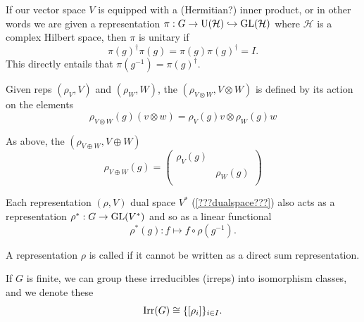 \begin{definition} If our vector space $V$ is equipped  with a (Hermitian?)
  inner product, or in other words we are given a representation $\pi : G \to
  \mathrm{U}(\mathcal{H}) \hookrightarrow \mathrm{GL}(\mathcal{H})$ where $\mathcal{H}$ is a
  complex Hilbert space, then $\pi$ is unitary if
  \[
    \pi(g)^\dagger \pi(g) = \pi(g)\pi(g)^\dagger = I.
  \]
  This directly entails that $\pi(g^{-1}) = \pi(g)^\dagger$.
\end{definition}

\begin{definition}
  \label{symm:def:tensor_product_representation}
  Given reps $(\rho_V, V)$ and $(\rho_W, W)$, the \emph{} $(\rho_{V\otimes W}, V \otimes W)$ is defined by its action
  on the elements
  \[
    \rho_{V \otimes W}(g) (v \otimes w) = \rho_V(g) v \otimes \rho_W(g) w
  \]
\end{definition}

\begin{definition}
  As above, the \emph{} $(\rho_{V \oplus W}, V
  \oplus W)$ 
  \[
    \rho_{V \oplus W}(g) = \begin{pmatrix}
      \rho_V(g) &   \\
       &  \rho_W(g) \\
    \end{pmatrix}
  \]
\end{definition}

\begin{definition} Each representation $(\rho, V)$ dual
space $V^\ast$ (\eqref{???dualspace???}) also acts as a representation
$\rho^\ast : G \to \mathrm{GL}(V^\ast)$ and so as a linear functional
\begin{equation}\label{sym:eq:dualRepresentation}
  \rho^\ast(g) : f \mapsto f \circ \rho(g^{-1}).
\end{equation}
\end{definition}


\begin{definition}
  A representation $\rho$ is called \emph{} if it cannot be written as a direct sum representation.

  If $G$ is finite, we can group these irreducibles (irreps) into isomorphism classes, and we denote these
  \[
    \mathrm{Irr}(G) \cong \{[\rho_i]\}_{i \in I}. 
  \]
\end{definition}

